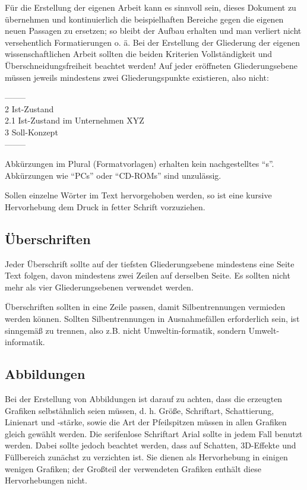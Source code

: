 \documentclass[11pt]{scrartcl}
\begin{document}
Für die Erstellung der eigenen Arbeit kann es sinnvoll sein, dieses Dokument zu übernehmen  und kontinuierlich die beispielhaften Bereiche gegen die eigenen neuen Passagen zu ersetzen; so bleibt der Aufbau erhalten und man verliert nicht versehentlich Formatierungen o. ä. Bei der Erstellung der Gliederung der eigenen wissenschaftlichen Arbeit sollten die beiden Kriterien Vollständigkeit und Überschneidungsfreiheit beachtet werden! Auf jeder eröffneten Gliederungsebene müssen jeweils mindestens zwei Gliederungspunkte existieren, also nicht:

\noindent--------\\
2	Ist-Zustand\\
2.1	Ist-Zustand im Unternehmen XYZ\\
3	Soll-Konzept\\
--------

Abkürzungen im Plural (Formatvorlagen) erhalten kein nachgestelltes "`s"'. Abkürzungen wie "`PCs"' oder "`CD-ROMs"' sind unzulässig.

Sollen einzelne Wörter im Text hervorgehoben werden, so ist eine kursive Hervorhebung dem Druck in fetter Schrift  vorzuziehen.

\subsection{Überschriften}
Jeder Überschrift sollte auf der tiefsten Gliederungsebene mindestens eine Seite Text folgen, davon mindestens zwei Zeilen auf derselben Seite. Es sollten nicht mehr als vier Gliederungsebenen verwendet werden. 

Überschriften sollten in eine Zeile passen, damit Silbentrennungen vermieden werden können. Sollten Silbentrennungen in Ausnahmefällen erforderlich sein, ist sinngemäß zu trennen, also z.B. nicht Umweltin-formatik, sondern Umwelt-informatik.

\subsection{Abbildungen}
Bei der Erstellung von Abbildungen ist darauf zu achten, dass die erzeugten Grafiken selbstähnlich seien müssen, d. h. Größe, Schriftart, Schattierung, Linienart und -stärke, sowie die Art der Pfeilspitzen müssen in allen Grafiken gleich gewählt werden. Die serifenlose Schriftart Arial sollte in jedem Fall benutzt werden. Dabei sollte jedoch beachtet werden, dass auf Schatten, 3D-Effekte  und Füllbereich zunächst zu verzichten ist. Sie dienen als Hervorhebung in einigen wenigen Grafiken; der Großteil der verwendeten Grafiken enthält diese Hervorhebungen nicht.
\end{document}
